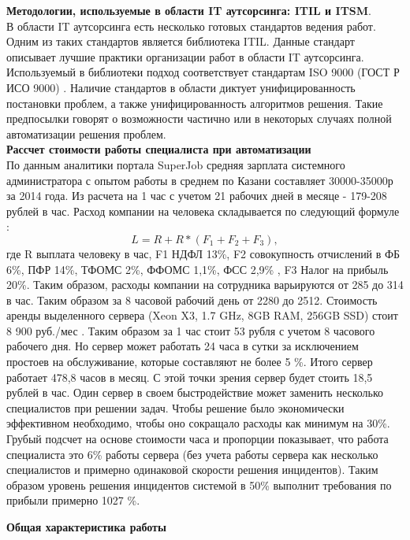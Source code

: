 \textbf{Методологии, используемые в области IT аутсорсинга: ITIL и ITSM}. \\
В области IT аутсорсинга есть несколько готовых стандартов ведения работ. Одним из таких стандартов является библиотека ITIL. Данные стандарт описывает лучшие практики организации работ в области IT аутсорсинга. Используемый в библиотеки подход соответствует стандартам ISO 9000 (ГОСТ Р ИСО 9000) \cite{ITIL1} \cite{ITIL2} \cite{ITIL3}.
Наличие стандартов в области диктует унифицированность постановки проблем, а также унифицированность алгоритмов решения. Такие предпосылки говорят о возможности частично или в некоторых случаях полной автоматизации решения проблем. \\
\textbf{Рассчет стоимости работы специалиста при автоматизации} \\
По данным аналитики портала SuperJob \cite{SuperJob} средняя зарплата системного администратора с опытом работы в среднем по Казани составляет 30000-35000р за 2014 года. Из расчета на 1 час с учетом 21 рабочих дней в месяце - 179-208 рублей в час. Расход компании на человека складывается по следующий формуле \cite{FiscalCodecs} :
\[
L = R + R*(F_1 +F_2+F_3),
\]
где R выплата человеку в час, F1 НДФЛ 13\%, F2 совокупность отчислений в ФБ 6\%, ПФР 14\%, ТФОМС 2\%, ФФОМС 1,1\%, ФСС 2,9\% , F3 Налог на прибыль 20\%. 
Таким образом, расходы компании на сотрудника варьируются от 285 до 314 в час. Таким образом за 8 часовой рабочий день от 2280 до 2512. Стоимость аренды выделенного сервера (Xeon X3, 1.7 GHz, 8GB RAM, 256GB SSD) стоит 8 900 руб./мес \cite{TimeWeb}. Таким образом за 1 час стоит 53 рубля с учетом 8 часового рабочего дня. Но сервер может работать 24 часа в сутки за исключением простоев на обслуживание, которые составляют не более 5 \%. Итого сервер работает 478,8 часов в месяц. С этой точки зрения сервер будет стоить 18,5 рублей в час. Один сервер в своем быстродействие может заменить несколько специалистов при решении задач. Чтобы решение было экономически эффективном необходимо, чтобы оно сокращало расходы как минимум на 30\%. Грубый подсчет на основе стоимости часа и пропорции показывает, что работа специалиста это 6\% работы сервера (без учета работы сервера как несколько специалистов и примерно одинаковой скорости решения инцидентов). Таким образом уровень решения инцидентов системой в 50\% выполнит требования по прибыли примерно 1027 \%. 


\textbf{Общая характеристика работы} 

